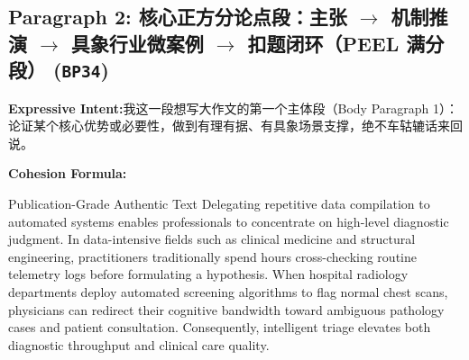 \subsection*{Paragraph 2: 核心正方分论点段：主张 $\to$ 机制推演 $\to$ 具象行业微案例 $\to$ 扣题闭环（PEEL 满分段） (\texttt{BP34})}
\noindent\textbf{Expressive Intent:}\enspace 我这一段想写大作文的第一个主体段（Body Paragraph 1）：论证某个核心优势或必要性，做到有理有据、有具象场景支撑，绝不车轱辘话来回说。\par
\noindent\textbf{Cohesion Formula:}\par\vspace{4pt}
\begin{ExampleBox}{Publication-Grade Authentic Text}
Delegating repetitive data compilation to automated systems enables professionals to concentrate on high-level diagnostic judgment. In data-intensive fields such as clinical medicine and structural engineering, practitioners traditionally spend hours cross-checking routine telemetry logs before formulating a hypothesis. When hospital radiology departments deploy automated screening algorithms to flag normal chest scans, physicians can redirect their cognitive bandwidth toward ambiguous pathology cases and patient consultation. Consequently, intelligent triage elevates both diagnostic throughput and clinical care quality.
\end{ExampleBox}
